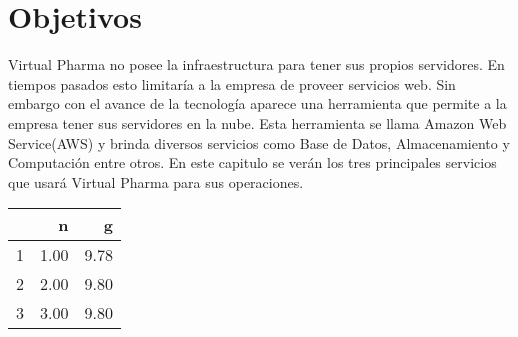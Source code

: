 \section*{Objetivos}\label{sec:Objetivos}
Virtual Pharma no posee la infraestructura para tener sus propios servidores. En tiempos pasados esto limitaría a la empresa de proveer servicios web. Sin embargo con el avance de la tecnología aparece una herramienta que permite a la empresa tener sus servidores en la nube. Esta herramienta se llama Amazon Web Service(AWS) y brinda diversos servicios como Base de Datos, Almacenamiento y Computación entre otros. En este capitulo se verán los tres principales servicios que usará Virtual Pharma para sus operaciones.
\begin{table}[ht]
\centering
\begin{tabular}{rrr}
  \hline
 & n & g \\ 
  \hline
1 & 1.00 & 9.78 \\ 
  2 & 2.00 & 9.80 \\ 
  3 & 3.00 & 9.80 \\ 
   \hline
\end{tabular}
\end{table}